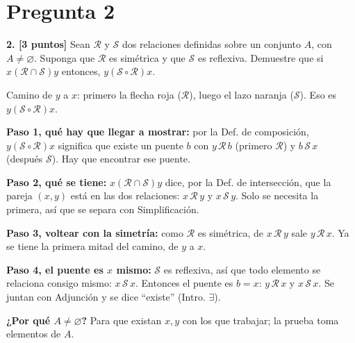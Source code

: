 \documentclass[11pt]{article}
\newcommand{\R}{\mathcal{R}}
\newcommand{\Sr}{\mathcal{S}}
\newcommand{\hl}[1]{\colorbox{green!35}{#1}}
\begin{document}
\clearpage
\section*{Pregunta 2}

\textbf{2. [3 puntos]} Sean $\R$ y $\Sr$ dos relaciones definidas sobre un conjunto $A$, con $A\neq\varnothing$. Suponga que \hl{$\R$ es simétrica} y que \hl{$\Sr$ es reflexiva}. Demuestre que si $x(\R\cap\Sr)y$ entonces, $y(\Sr\circ\R)x$.

\begin{center}

{\small Camino de $y$ a $x$: primero la flecha roja ($\R$), luego el lazo naranja ($\Sr$). Eso es $y(\Sr\circ\R)x$.}
\end{center}

\calculo{y\ \bajo{\R}{\text{simétrica}}\ x\ \bajo{\Sr}{\text{reflexiva}}\ x\ \Longrightarrow\ y\,(\Sr\circ\R)\,x}

\begin{explica}
\textbf{Paso 1, qué hay que llegar a mostrar:} por la Def. de composición, $y(\Sr\circ\R)x$ significa que existe un puente $b$ con $y\,\R\,b$ (primero $\R$) y $b\,\Sr\,x$ (después $\Sr$). Hay que encontrar ese puente.

\textbf{Paso 2, qué se tiene:} $x(\R\cap\Sr)y$ dice, por la Def. de intersección, que la pareja $(x,y)$ está en las dos relaciones: $x\,\R\,y$ y $x\,\Sr\,y$. Solo se necesita la primera, así que se separa con Simplificación.

\textbf{Paso 3, voltear con la simetría:} como $\R$ es simétrica, de $x\,\R\,y$ sale $y\,\R\,x$. Ya se tiene la primera mitad del camino, de $y$ a $x$.

\textbf{Paso 4, el puente es $x$ mismo:} $\Sr$ es reflexiva, así que todo elemento se relaciona consigo mismo: $x\,\Sr\,x$. Entonces el puente es $b=x$: $y\,\R\,x$ y $x\,\Sr\,x$. Se juntan con Adjunción y se dice ``existe'' (Intro. $\exists$).

\textbf{¿Por qué $A\neq\varnothing$?} Para que existan $x,y$ con los que trabajar; la prueba toma elementos de $A$.
\end{explica}
\end{document}
